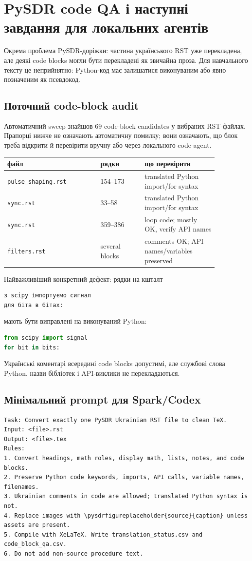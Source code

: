 
\chapter{PySDR code QA і наступні завдання для локальних агентів}
\label{chap:pysdr_code_qa_tasks}

Окрема проблема PySDR-доріжки: частина українського RST уже перекладена, але деякі code blocks могли бути перекладені як звичайна проза. Для навчального тексту це неприйнятно: Python-код має залишатися виконуваним або явно позначеним як псевдокод.

\section{Поточний code-block audit}
Автоматичний sweep знайшов 69 code-block candidates у вибраних RST-файлах. Прапорці нижче не означають автоматичну помилку; вони означають, що блок треба відкрити й перевірити вручну або через локального code-agent.


\begin{longtable}{L{0.38\linewidth}L{0.18\linewidth}L{0.30\linewidth}}
\toprule
файл & рядки & що перевірити \\
\midrule
\endhead
\texttt{pulse\_shaping.rst} & 154--173 & translated Python import/for syntax \\
\texttt{sync.rst} & 33--58 & translated Python import/for syntax \\
\texttt{sync.rst} & 359--386 & loop code; mostly OK, verify API names \\
\texttt{filters.rst} & several blocks & comments OK; API names/variables preserved \\
\bottomrule
\end{longtable}

Найважливіший конкретний дефект: рядки на кшталт
\begin{lstlisting}[language=Python]
з scipy імпортуємо сигнал
для біта в бітах:
\end{lstlisting}
мають бути виправлені на виконуваний Python:
\begin{lstlisting}[language=Python]
from scipy import signal
for bit in bits:
\end{lstlisting}
Українські коментарі всередині code blocks допустимі, але службові слова Python, назви бібліотек і API-виклики не перекладаються.

\section{Мінімальний prompt для Spark/Codex}
\begin{lstlisting}[language={}]
Task: Convert exactly one PySDR Ukrainian RST file to clean TeX.
Input: <file>.rst
Output: <file>.tex
Rules:
1. Convert headings, math roles, display math, lists, notes, and code blocks.
2. Preserve Python code keywords, imports, API calls, variable names, filenames.
3. Ukrainian comments in code are allowed; translated Python syntax is not.
4. Replace images with \pysdrfigureplaceholder{source}{caption} unless assets are present.
5. Compile with XeLaTeX. Write translation_status.csv and code_block_qa.csv.
6. Do not add non-source procedure text.
\end{lstlisting}

